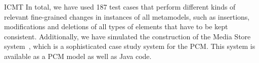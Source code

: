 \begin{copiedFrom}{ICMT}
In total, we have used 187 test cases that perform different kinds of relevant fine-grained changes in instances of all metamodels, such as insertions, modifications and deletions of all types of elements that have to be kept consistent.
Additionally, we have simulated the construction of the Media Store system~\cite{strittmatter2016a}, which is a sophisticated case study system for the \ac{PCM}.
This system is available as a \ac{PCM} model as well as Java code.





\end{copiedFrom}
